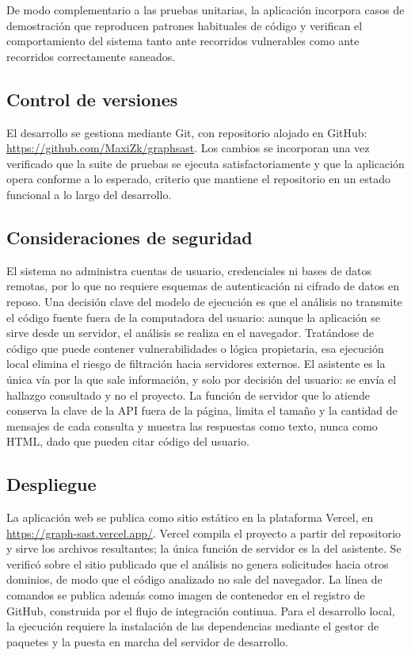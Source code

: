 De modo complementario a las pruebas unitarias, la aplicación incorpora casos de demostración que reproducen patrones habituales de código y verifican el comportamiento del sistema tanto ante recorridos vulnerables como ante recorridos correctamente saneados.

\subsection{Control de versiones}\label{sec:n4.7.2}

El desarrollo se gestiona mediante Git, con repositorio alojado en GitHub: \url{https://github.com/MaxiZk/graphsast}. Los cambios se incorporan una vez verificado que la suite de pruebas se ejecuta satisfactoriamente y que la aplicación opera conforme a lo esperado, criterio que mantiene el repositorio en un estado funcional a lo largo del desarrollo.

\subsection{Consideraciones de seguridad}\label{sec:n4.7.3}

El sistema no administra cuentas de usuario, credenciales ni bases de datos remotas, por lo que no requiere esquemas de autenticación ni cifrado de datos en reposo. Una decisión clave del modelo de ejecución es que el análisis no transmite el código fuente fuera de la computadora del usuario: aunque la aplicación se sirve desde un servidor, el análisis se realiza en el navegador. Tratándose de código que puede contener vulnerabilidades o lógica propietaria, esa ejecución local elimina el riesgo de filtración hacia servidores externos. El asistente es la única vía por la que sale información, y solo por decisión del usuario: se envía el hallazgo consultado y no el proyecto. La función de servidor que lo atiende conserva la clave de la API fuera de la página, limita el tamaño y la cantidad de mensajes de cada consulta y muestra las respuestas como texto, nunca como HTML, dado que pueden citar código del usuario.

\subsection{Despliegue}\label{sec:n4.7.4}

La aplicación web se publica como sitio estático en la plataforma Vercel, en \url{https://graph-sast.vercel.app/}. Vercel compila el proyecto a partir del repositorio y sirve los archivos resultantes; la única función de servidor es la del asistente. Se verificó sobre el sitio publicado que el análisis no genera solicitudes hacia otros dominios, de modo que el código analizado no sale del navegador. La línea de comandos se publica además como imagen de contenedor en el registro de GitHub, construida por el flujo de integración continua. Para el desarrollo local, la ejecución requiere la instalación de las dependencias mediante el gestor de paquetes y la puesta en marcha del servidor de desarrollo.
